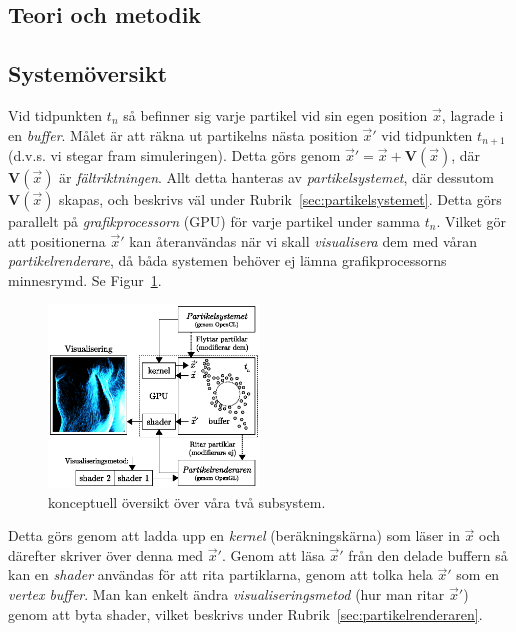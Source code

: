 \documentclass[a4paper]{article}
\begin{document}
\begin{multicols}{2}
    \vspace{-0.4cm}
    \section{Teori och metodik}
    \subsection{Systemöversikt}

    Vid tidpunkten \(t_n\) så befinner sig varje partikel vid sin egen position \(\vec{x}\), lagrade i en \emph{buffer}. Målet är att räkna ut partikelns nästa position \(\vec{x}'\) vid tidpunkten \(t_{n+1}\) (d.v.s. vi stegar fram simuleringen). Detta görs genom \(\vec{x}' = \vec{x} + \mathbf{V}(\vec{x})\), där \(\mathbf{V}(\vec{x})\) är \emph{fältriktningen}. Allt detta hanteras av \emph{partikelsystemet}, där dessutom \(\mathbf{V}(\vec{x})\) skapas, och beskrivs väl under Rubrik~\ref{sec:partikelsystemet}. Detta görs parallelt på \emph{grafikprocessorn} (GPU) för varje partikel under samma \(t_n\). Vilket gör att positionerna \(\vec{x}'\) kan återanvändas när vi skall \emph{visualisera} dem med våran \emph{partikelrenderare}, då båda systemen behöver ej lämna grafikprocessorns minnesrymd. Se Figur~\ref{fig:system}.

    \begin{figure}[H]
    \center
    \includegraphics[width=0.5\textwidth]{share/System.eps}
    \caption{konceptuell översikt över våra två subsystem.}
    \label{fig:system}
    \end{figure}

    Detta görs genom att ladda upp en \emph{kernel} (beräkningskärna) som läser in \(\vec{x}\) och därefter skriver över denna med \(\vec{x}'\). Genom att läsa \(\vec{x}'\) från den delade buffern så kan en \emph{shader} användas för att rita partiklarna, genom att tolka hela \(\vec{x}'\) som en \emph{vertex buffer}. Man kan enkelt ändra \emph{visualiseringsmetod} (hur man ritar \(\vec{x}'\)) genom att byta shader, vilket beskrivs under Rubrik~\ref{sec:partikelrenderaren}.


\end{multicols}
\end{document}
